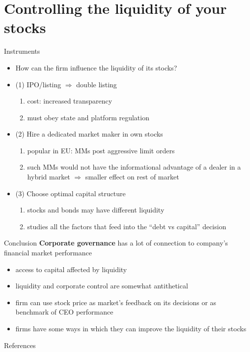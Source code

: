 \documentclass[english,10pt
,aspectratio=169
]{beamer}
\begin{document}
\section{Controlling the liquidity of your stocks}

\begin{frame}{Instruments}
	\begin{itemize}
		\item How can the firm influence the liquidity of its stocks?
		\item (1) IPO/listing $\Rightarrow$ double listing
		\begin{enumerate}
			\item cost: increased transparency
			\item must obey state and platform regulation
		\end{enumerate}
		\item (2) Hire a dedicated market maker in own stocks
		\begin{enumerate}
			\item popular in EU: MMs post aggressive limit orders
			\item such MMs would not have the informational advantage of a dealer in a hybrid market $\Rightarrow$ smaller effect on rest of market
		\end{enumerate}
		\item (3) Choose optimal capital structure
		\begin{enumerate}
			\item stocks and bonds may have different liquidity
			\item {} studies all the factors that feed into the ``debt vs capital'' decision
		\end{enumerate}
	\end{itemize}
\end{frame}


\begin{frame}{Conclusion}
	\textbf{Corporate governance} has a lot of connection to company's financial market performance
	\begin{itemize}
		\item access to capital affected by liquidity
		\item liquidity and corporate control are somewhat antithetical
		\item firm can use stock price as market's feedback on its decisions or as benchmark of CEO performance
		\item firms have some ways in which they can improve the liquidity of their stocks
	\end{itemize}
\end{frame}


\appendix
\begin{frame}[allowframebreaks]{References}
	
	
\end{frame}
\end{document}
